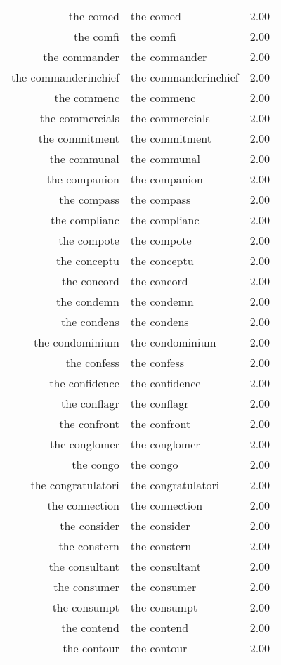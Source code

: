 \begin{table}[ht]
\begin{tabular}{rlr}
  the comed & the comed & 2.00 \\ 
  the comfi & the comfi & 2.00 \\ 
  the commander & the commander & 2.00 \\ 
  the commanderinchief & the commanderinchief & 2.00 \\ 
  the commenc & the commenc & 2.00 \\ 
  the commercials & the commercials & 2.00 \\ 
  the commitment & the commitment & 2.00 \\ 
  the communal & the communal & 2.00 \\ 
  the companion & the companion & 2.00 \\ 
  the compass & the compass & 2.00 \\ 
  the complianc & the complianc & 2.00 \\ 
  the compote & the compote & 2.00 \\ 
  the conceptu & the conceptu & 2.00 \\ 
  the concord & the concord & 2.00 \\ 
  the condemn & the condemn & 2.00 \\ 
  the condens & the condens & 2.00 \\ 
  the condominium & the condominium & 2.00 \\ 
  the confess & the confess & 2.00 \\ 
  the confidence & the confidence & 2.00 \\ 
  the conflagr & the conflagr & 2.00 \\ 
  the confront & the confront & 2.00 \\ 
  the conglomer & the conglomer & 2.00 \\ 
  the congo & the congo & 2.00 \\ 
  the congratulatori & the congratulatori & 2.00 \\ 
  the connection & the connection & 2.00 \\ 
  the consider & the consider & 2.00 \\ 
  the constern & the constern & 2.00 \\ 
  the consultant & the consultant & 2.00 \\ 
  the consumer & the consumer & 2.00 \\ 
  the consumpt & the consumpt & 2.00 \\ 
  the contend & the contend & 2.00 \\ 
  the contour & the contour & 2.00 \\ 

\end{tabular}
\end{table}
